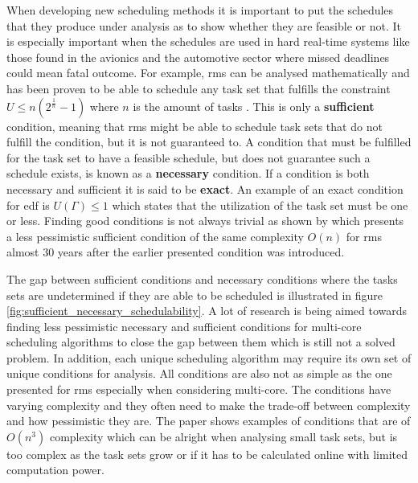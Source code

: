 \documentclass{kththesis}
\begin{document}
When developing new scheduling methods it is important to put the schedules that they produce under
analysis as to show whether they are feasible or not. It is especially important when the schedules
are used in hard real-time systems like those found in the avionics and the automotive sector where
missed deadlines could mean fatal outcome. For example, \acrshort{rms} can be analysed
mathematically and has been proven to be able to schedule any task set that fulfills the constraint
$ U \le n(2^{\frac{1}{n}}-1) $ where $ n $ is the amount of tasks \parencite{liu_scheduling_1973}.
This is only a \textbf{sufficient} condition, meaning that \acrshort{rms} might be able to schedule
task sets that do not fulfill the condition, but it is not guaranteed to. A condition that must be
fulfilled for the task set to have a feasible schedule, but does not guarantee such a schedule
exists, is known as a \textbf{necessary} condition. If a condition is both necessary and sufficient
it is said to be \textbf{exact}. An example of an exact condition for \acrshort{edf} is $ U(\Gamma)
\leq 1 $ which states that the utilization of the task set must be one or less. Finding good
conditions is not always trivial as shown by \parencite{bini_hyperbolic_2001} which presents a less
pessimistic sufficient condition of the same complexity $ O(n) $ for \acrshort{rms} almost 30 years
after the earlier presented condition was introduced. 

The gap between sufficient conditions and necessary conditions where the tasks sets are undetermined
if they are able to be scheduled is illustrated in figure
\ref{fig:sufficient_necessary_schedulability}. A lot of research is being aimed towards finding less
pessimistic necessary and sufficient conditions for multi-core scheduling algorithms to close the
gap between them which is still not a solved problem. In addition, each unique scheduling algorithm
may require its own set of unique conditions for analysis. All conditions are also not as simple as
the one presented for \acrshort{rms} especially when considering multi-core. The conditions have
varying complexity and they often need to make the trade-off between complexity and how pessimistic
they are. The paper \parencite{bertogna_tests_2011} shows examples of conditions that are of $
O(n^3) $ complexity which can be alright when analysing small task sets, but is too complex as the
task sets grow or if it has to be calculated online with limited computation power.
\end{document}
